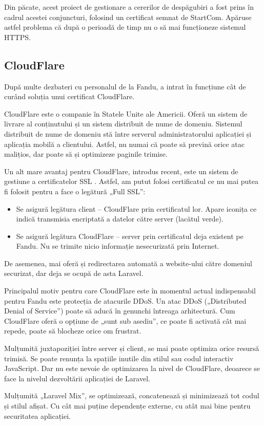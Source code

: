 		Din păcate, acest proiect de gestionare a cererilor de despăgubiri a fost prins în cadrul acestei conjuncturi, folosind un certificat semnat de StartCom.
		Apăruse astfel problema că după o perioadă de timp nu o să mai funcționeze sistemul HTTPS.

	\subsection{CloudFlare}

		După multe dezbateri cu personalul de la Fandu, a intrat în funcțiune cât de curând soluția unui certificat CloudFlare.

		CloudFlare este o companie în Statele Unite ale Americii.
		Oferă un sistem de livrare al conținutului și un sistem distribuit de nume de domeniu.
		Sistemul distribuit de nume de domeniu stă între serverul administratorului aplicației și aplicația mobilă a clientului.
		Astfel, nu numai că poate să prevină orice atac malițios, dar poate să și optimizeze paginile trimise.

		Un alt mare avantaj pentru CloudFlare, introdus recent, este un sistem de gestiune a certificatelor SSL \cite{cloudflare_ssl}.
		Astfel, am putut folosi certificatul ce nu mai putea fi folosit pentru a face o legătură „Full SSL”:
		\begin{itemize}
			\item
			Se asigură legătura client -- CloudFlare prin certificatul lor.
			Apare iconița ce indică transmisia encriptată a datelor către server (lacătul verde).
			\item
			Se asigură legătura CloudFlare -- server prin certificatul deja existent pe Fandu.
			Nu se trimite nicio informație nesecurizată prin Internet.
		\end{itemize}

		De asemenea, mai oferă și redirectarea automată a website-ului către domeniul securizat, dar deja se ocupă de asta Laravel.

		Principalul motiv pentru care CloudFlare este în momentul actual indispensabil pentru Fandu este protecția de atacurile DDoS.
		Un atac DDoS („Distributed Denial of Service”) poate să aducă în genunchi întreaga arhitectură.
		Cum CloudFlare oferă o opțiune de „sunt sub asediu”, ce poate fi activată cât mai repede, poate să blocheze orice om frustrat.

		Mulțumită juxtapoziției între server și client, se mai poate optimiza orice resursă trimisă.
		Se poate renunța la spațiile inutile din stilul sau codul interactiv JavaScript.
		Dar nu este nevoie de optimizarea la nivel de CloudFlare, deoarece se face la nivelul dezvoltării aplicației de Laravel.

		Mulțumită „Laravel Mix”, se optimizează, concatenează și minimizează tot codul și stilul afișat.
		Cu cât mai puține dependențe externe, cu atât mai bine pentru securitatea aplicației.
